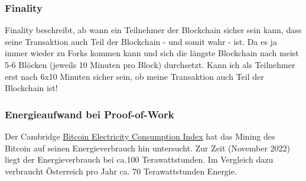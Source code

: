 \documentclass[10pt,a4paper,titlepage]{paper}
\begin{document}
\subsubsection{Finality}
Finality beschreibt, ab wann ein Teilnehmer der Blockchain sicher sein kann, dass seine Transaktion auch Teil der Blockchain - und somit wahr - ist. Da es ja immer wieder zu Forks kommen kann und sich die längste Blockchain nach meist 5-6 Blöcken (jeweils 10 Minuten pro Block) durchsetzt. Kann ich als Teilnehmer erst nach 6x10 Minuten sicher sein, ob meine Transaktion auch Teil der Blockchain ist!
\subsubsection{Energieaufwand bei Proof-of-Work}
Der Cambridge \href{https://ccaf.io/cbeci/index}{\color{blue}Bitcoin Electricity Consumption Index} hat das Mining des Bitcoin auf seinen Energieverbrauch hin untersucht. Zur Zeit (November 2022) liegt der Energieverbrauch bei ca.100 Terawattstunden. Im Vergleich dazu verbraucht Österreich pro Jahr ca. 70 Terawattstunden Energie.
\end{document}
